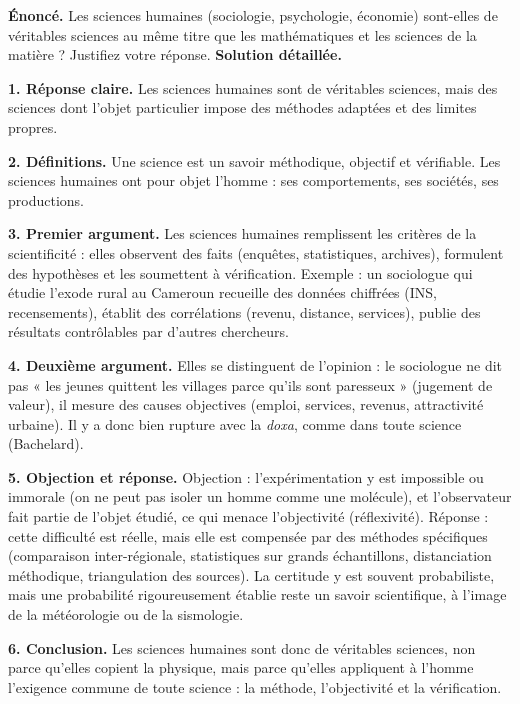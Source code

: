 \documentclass[11pt]{article}
\newcommand{\cle}[1]{{\popxbold\color{popdark}#1}}
\begin{document}
\begin{exoresolu}
\textbf{Énoncé.} Les sciences humaines (sociologie, psychologie, économie) sont-elles de véritables sciences au même titre que les mathématiques et les sciences de la matière ? Justifiez votre réponse.
\tcblower
\textbf{Solution détaillée.}

\textbf{1. Réponse claire.} Les sciences humaines sont de véritables sciences, mais des sciences dont l'objet particulier impose des méthodes adaptées et des limites propres.

\textbf{2. Définitions.} Une \cle{science} est un savoir méthodique, objectif et vérifiable. Les \cle{sciences humaines} ont pour objet l'homme : ses comportements, ses sociétés, ses productions.

\textbf{3. Premier argument.} Les sciences humaines remplissent les critères de la scientificité : elles observent des faits (enquêtes, statistiques, archives), formulent des hypothèses et les soumettent à vérification. Exemple : un sociologue qui étudie l'exode rural au Cameroun recueille des données chiffrées (INS, recensements), établit des corrélations (revenu, distance, services), publie des résultats contrôlables par d'autres chercheurs.

\textbf{4. Deuxième argument.} Elles se distinguent de l'opinion : le sociologue ne dit pas « les jeunes quittent les villages parce qu'ils sont paresseux » (jugement de valeur), il mesure des causes objectives (emploi, services, revenus, attractivité urbaine). Il y a donc bien rupture avec la \emph{doxa}, comme dans toute science (Bachelard).

\textbf{5. Objection et réponse.} Objection : l'expérimentation y est impossible ou immorale (on ne peut pas isoler un homme comme une molécule), et l'observateur fait partie de l'objet étudié, ce qui menace l'objectivité (réflexivité). Réponse : cette difficulté est réelle, mais elle est compensée par des méthodes spécifiques (comparaison inter-régionale, statistiques sur grands échantillons, distanciation méthodique, triangulation des sources). La certitude y est souvent probabiliste, mais une probabilité rigoureusement établie reste un savoir scientifique, à l'image de la météorologie ou de la sismologie.

\textbf{6. Conclusion.} Les sciences humaines sont donc de véritables sciences, non parce qu'elles copient la physique, mais parce qu'elles appliquent à l'homme l'exigence commune de toute science : la méthode, l'objectivité et la vérification.
\end{exoresolu}
\end{document}
